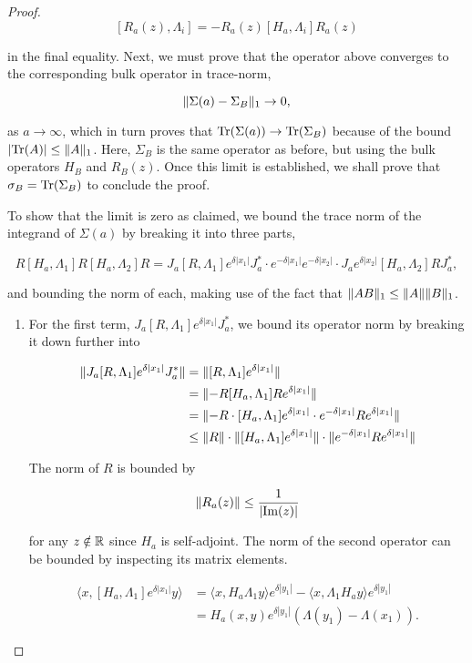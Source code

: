 \documentclass[12pt, letterpaper]{article}
\begin{document}
\begin{proof}
\[[R_a(z),\Lambda_i] = -R_a(z)[H_a,\Lambda_i]R_a(z)\]

in the final equality. Next, we must prove that the operator above converges to the corresponding bulk operator in trace-norm,

\[ \lVert \Sigma(a) - \Sigma_B \rVert_1 \to 0,\]

as $a\to\infty$, which in turn proves that $\text{Tr}(\Sigma(a))\to\text{Tr}(\Sigma_B)$ because of the bound $|\text{Tr}(A)|\leq \lVert A \rVert_1$. Here, $\Sigma_B$ is the same operator as before, but using the bulk operators $H_B$ and $R_B(z)$. Once this limit is established, we shall prove that $\sigma_B = \text{Tr}(\Sigma_B)$ to conclude the proof. 

To show that the limit is zero as claimed, we bound the trace norm of the integrand of $\Sigma(a)$ by breaking it into three parts,

\[R[H_a,\Lambda_1]R[H_a,\Lambda_2]R = J_a[R,\Lambda_1]e^{\delta|x_1|}J_a^*\cdot e^{-\delta|x_1|}e^{-\delta|x_2|}\cdot J_ae^{\delta|x_2|}[H_a, \Lambda_2]RJ_a^*,\]

and bounding the norm of each, making use of the fact that $\lVert AB \rVert_1 \leq \lVert A \rVert\lVert B \rVert_1$.

\begin{enumerate}
\item For the first term, $J_a[R,\Lambda_1]e^{\delta|x_1|}J_a^*$, we bound its operator norm by breaking it down further into

\[\begin{aligned}
\|J_a[R,\Lambda_1]e^{\delta|x_1|}J_a^*\| &= \|[R,\Lambda_1]e^{\delta|x_1|}\| \\
&=\lVert -R[H_a,\Lambda_1]Re^{\delta|x_1|} \rVert\\
&= \lVert -R\cdot [H_a,\Lambda_1]e^{\delta|x_1|}\cdot e^{-\delta|x_1|} R e^{\delta|x_1|} \rVert\\
&\leq \lVert R \rVert\cdot \lVert [H_a,\Lambda_1]e^{\delta|x_1|} \rVert\cdot \lVert e^{-\delta|x_1|}Re^{\delta|x_1|} \rVert
\end{aligned}\]

The norm of $R$ is bounded by 

\[\lVert R_a(z) \rVert \leq \frac{1}{|\text{Im}(z)|}\]

for any $z\notin \mathbb{R}$ since $H_a$ is self-adjoint. The norm of the second operator can be bounded by inspecting its matrix elements.

\[\begin{aligned}
\langle x, [H_a,\Lambda_1]e^{\delta|x_1|} y\rangle &= \langle x, H_a\Lambda_1 y\rangle e^{\delta |y_1|} - \langle x, \Lambda_1 H_a y\rangle e^{\delta|y_1|}  \\
&= H_a(x,y)e^{\delta|y_1|}(\Lambda(y_1)-\Lambda(x_1)).
\end{aligned}\]


\end{enumerate}
\end{proof}
\end{document}
